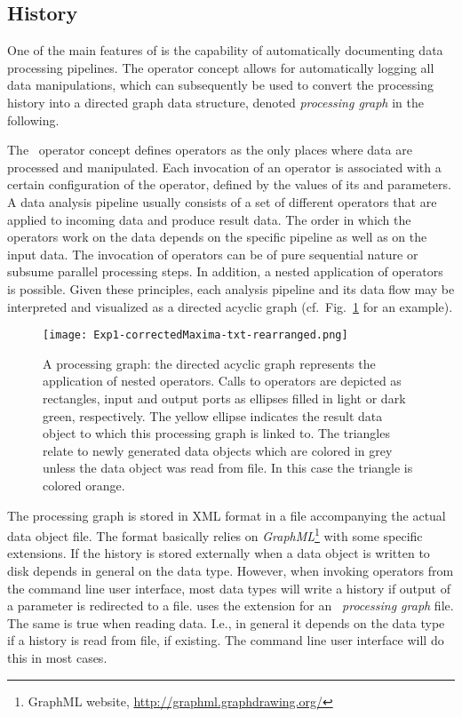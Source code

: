 \subsection{History}


One of the main features of \alida is the capability of automatically documenting data processing
pipelines. 
The operator concept allows for automatically logging all data manipulations,
which can subsequently be used to convert the
processing history into a directed graph data structure, denoted {\em processing
graph} in the following.
 
The \alida\ operator concept defines operators as the only places where data are processed and manipulated. 
Each invocation of an operator is associated with a certain configuration of the operator, defined by the values of its  and  parameters.
A data analysis pipeline usually consists of a set of different operators that are applied to incoming data and
produce result data. The order in which the operators work on the data depends on the specific pipeline as well as on the input data. The invocation of
operators can be of pure sequential nature or subsume parallel processing steps. In addition, a nested application
of operators is possible. Given these principles, each analysis pipeline and its
data flow may be interpreted
and visualized as a directed acyclic graph (cf.~Fig.~\ref{fig:DAG2} for an
example).

\begin{figure}[t]
\begin{center}
\centerline{{\texttt{[image: Exp1-correctedMaxima-txt-rearranged.png]}}}
\end{center}
\vspace*{-0.75cm}
\caption[Example of a processing graph.]{\label{fig:DAG2}
A processing graph: the directed acyclic graph represents the application of nested operators. 
Calls to operators are depicted as rectangles, input and output ports as ellipses filled in light or dark green,
respectively. 
The yellow ellipse indicates the result data object
to which this processing graph is linked to.
The triangles relate to newly generated data objects which are colored in grey
unless the data object was read from file.
In this case the triangle is colored orange.}
\end{figure}

The processing graph is stored in XML format in a file accompanying the actual data object file. 
The format basically relies on {\em GraphML}\footnote{GraphML website, 
\href{http://graphml.graphdrawing.org/}{http://graphml.graphdrawing.org/}} with some \alida 
specific extensions. 
If the history is stored externally when a data object is written to disk
depends in general on the data type.
However, when invoking operators from the command line user interface,
most \alida data types will write a history if output of a parameter is
redirected to a file.
\alida uses the
extension  for an {\em \alida\ processing graph} file.
The same is true when reading data.
I.e., in general it depends on the data type if a history is read from file, if
existing. The command line user interface will do this in most cases.

